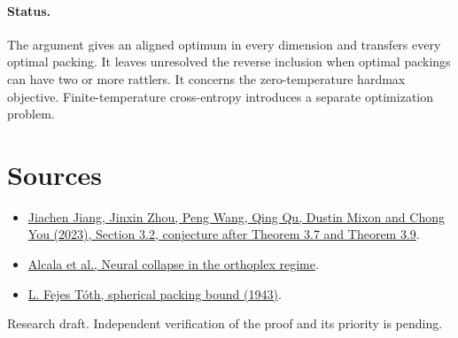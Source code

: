 \documentclass[11pt]{article}
\begin{document}
\paragraph{Status.} The argument gives an aligned optimum in every dimension and transfers every optimal packing. It leaves unresolved the reverse inclusion when optimal packings can have two or more rattlers. It concerns the zero-temperature hardmax objective. Finite-temperature cross-entropy introduces a separate optimization problem.

\section*{Sources}
\begin{itemize}
\item \href{https://arxiv.org/abs/2310.05351}{Jiachen Jiang, Jinxin Zhou, Peng Wang, Qing Qu, Dustin Mixon and Chong You (2023), Section 3.2, conjecture after Theorem 3.7 and Theorem 3.9}.
\item \href{https://arxiv.org/abs/2603.20587}{Alcala et al., Neural collapse in the orthoplex regime}.
\item \href{https://geodesic.mathdoc.fr/item/JDM_1943__53_146329/}{L. Fejes Tóth, spherical packing bound (1943)}.
\end{itemize}
{\small Research draft. Independent verification of the proof and its priority is pending.}
\end{document}
